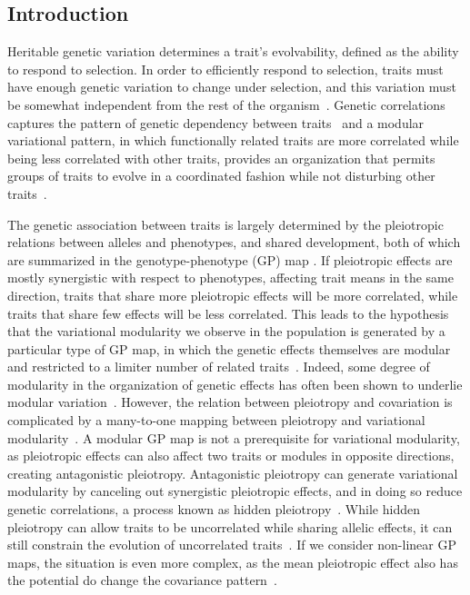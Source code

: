 \begin{refsection}


\section{Introduction}

Heritable genetic variation determines a trait's evolvability, defined as the
ability to respond to selection. In order to efficiently respond to selection,
traits must have enough genetic variation to change under selection, and this
variation must be somewhat independent from the rest of the
organism~\parencite{Lewontin1979-iw}. Genetic correlations captures the
pattern of genetic dependency between traits~\parencite{Lande1979-by,
Lande1983-ez} and a modular variational pattern, in which functionally related
traits are more correlated while being less correlated with other traits,
provides an organization that permits groups of traits to evolve in a
coordinated fashion while not disturbing other traits~\parencite{Olson1958-qk,
Cheverud1996-jw, Wagner2007-cx, Melo2016-yw}.

The genetic association between traits is largely determined by the
pleiotropic relations between alleles and phenotypes, and shared development,
both of which are summarized in the genotype-phenotype (GP) map . If pleiotropic
effects are mostly synergistic with respect to phenotypes, affecting trait
means in the same direction, traits that share more pleiotropic effects will
be more correlated, while traits that share few effects will be less
correlated. This leads to the hypothesis that the variational modularity we
observe in the population is generated by a particular type of GP map, in
which the genetic effects themselves are modular and restricted to a limiter
number of related traits~\parencite{Wagner1996-ui}. Indeed, some degree of
modularity in the organization of genetic effects has often been shown to
underlie modular variation~\parencite{Cheverud1997-rw, Mezey2000-rs, Kenney-Hunt2008-bd, 
Porto2016-qc, Leamy1999-dm}. However, the relation between
pleiotropy and covariation is complicated by a many-to-one mapping between
pleiotropy and variational modularity~\parencite{Mitteroecker2009-jb}. A
modular GP map is not a prerequisite for variational modularity, as pleiotropic
effects can also affect two traits or modules in opposite directions, creating
antagonistic pleiotropy. Antagonistic pleiotropy can generate variational
modularity by canceling out synergistic pleiotropic effects, and in doing so
reduce genetic correlations, a process known as hidden
pleiotropy~\parencite{Turelli1985-ne, Pavlicev2011-xm}. While hidden
pleiotropy can allow traits to be uncorrelated while sharing allelic effects,
it can still constrain the evolution of uncorrelated
traits~\parencite{Baatz1997-hh}. If we consider non-linear GP maps, the
situation is even more complex, as the mean pleiotropic effect also has the
potential do change the covariance pattern~\parencite{Mitteroecker2009-jb}.


\end{refsection}

